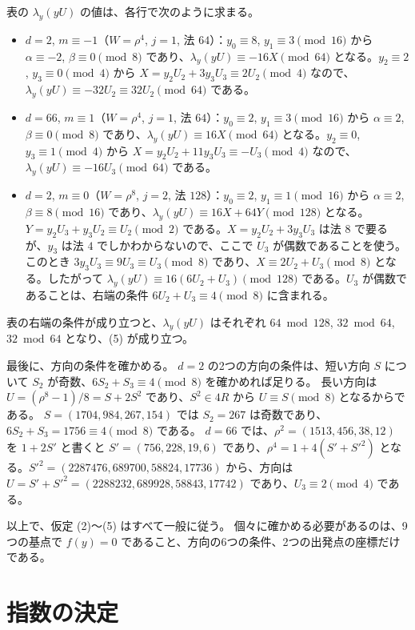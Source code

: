 \documentclass[a4paper,11pt]{ltjsarticle}
\theoremstyle{jplain}
\numberwithin{equation}{section}
\numberwithin{table}{section}
\begin{document}
表の $\lambda_y(yU)$ の値は、各行で次のように求まる。
\begin{itemize}
\item $d=2$, $m\equiv-1$（$W=\rho^4$, $j=1$, 法 $64$）：$y_0\equiv8$, $y_1\equiv3\pmod{16}$ から $\alpha\equiv-2$, $\beta\equiv0\pmod8$ であり、$\lambda_y(yU)\equiv-16X\pmod{64}$ となる。$y_2\equiv2$, $y_3\equiv0\pmod4$ から $X=y_2U_2+3y_3U_3\equiv2U_2\pmod4$ なので、$\lambda_y(yU)\equiv-32U_2\equiv32U_2\pmod{64}$ である。
\item $d=66$, $m\equiv1$（$W=\rho^4$, $j=1$, 法 $64$）：$y_0\equiv2$, $y_1\equiv3\pmod{16}$ から $\alpha\equiv2$, $\beta\equiv0\pmod8$ であり、$\lambda_y(yU)\equiv16X\pmod{64}$ となる。$y_2\equiv0$, $y_3\equiv1\pmod4$ から $X=y_2U_2+11y_3U_3\equiv-U_3\pmod4$ なので、$\lambda_y(yU)\equiv-16U_3\pmod{64}$ である。
\item $d=2$, $m\equiv0$（$W=\rho^8$, $j=2$, 法 $128$）：$y_0\equiv2$, $y_1\equiv1\pmod{16}$ から $\alpha\equiv2$, $\beta\equiv8\pmod{16}$ であり、$\lambda_y(yU)\equiv16X+64Y\pmod{128}$ となる。$Y=y_2U_3+y_3U_2\equiv U_2\pmod2$ である。$X=y_2U_2+3y_3U_3$ は法 $8$ で要るが、$y_3$ は法 $4$ でしかわからないので、ここで $U_3$ が偶数であることを使う。このとき $3y_3U_3\equiv9U_3\equiv U_3\pmod8$ であり、$X\equiv2U_2+U_3\pmod8$ となる。したがって $\lambda_y(yU)\equiv16(6U_2+U_3)\pmod{128}$ である。$U_3$ が偶数であることは、右端の条件 $6U_2+U_3\equiv4\pmod8$ に含まれる。
\end{itemize}
表の右端の条件が成り立つと、$\lambda_y(yU)$ はそれぞれ $64\bmod128$, $32\bmod64$, $32\bmod64$ となり、(5) が成り立つ。

最後に、方向の条件を確かめる。
$d=2$ の2つの方向の条件は、短い方向 $S$ について $S_2$ が奇数、$6S_2+S_3\equiv4\pmod8$ を確かめれば足りる。
長い方向は $U=(\rho^8-1)/8=S+2S^2$ であり、$S^2\in4R$ から $U\equiv S\pmod8$ となるからである。
$S=(1704,984,267,154)$ では $S_2=267$ は奇数であり、$6S_2+S_3=1756\equiv4\pmod8$ である。
$d=66$ では、$\rho^2=(1513,456,38,12)$ を $1+2S'$ と書くと $S'=(756,228,19,6)$ であり、$\rho^4=1+4(S'+S'^2)$ となる。$S'^2=(2287476,689700,58824,17736)$ から、方向は $U=S'+S'^2=(2288232,689928,58843,17742)$ であり、$U_3\equiv2\pmod4$ である。

以上で、仮定 (2)〜(5) はすべて一般に従う。
個々に確かめる必要があるのは、9つの基点で $f(y)=0$ であること、方向の6つの条件、2つの出発点の座標だけである。

\section{指数の決定}\label{sec:exponents}
\end{document}
